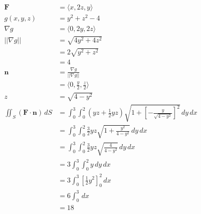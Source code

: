 \documentclass{article}
\begin{document}
\begin{align*}
  \mathbf{F}                                 & = \langle x, 2 z, y \rangle                                                                                              \\
  g(x, y, z)                                 & = y^2 + z^2 - 4                                                                                                          \\
  \nabla g                                   & = \langle 0, 2 y, 2 z \rangle                                                                                            \\
  ||\nabla g||                               & = \sqrt{4 y^2 + 4 z^2}                                                                                                   \\
                                             & = 2 \sqrt{y^2 + z^2}                                                                                                     \\
                                             & = 4                                                                                                                      \\
  \mathbf{n}                                 & = \frac{\nabla g}{||\nabla g||}                                                                                          \\
                                             & = \langle 0, \frac{y}{2}, \frac{z}{2} \rangle                                                                            \\
  z                                          & = \sqrt{4 - y^2}                                                                                                         \\
  \iint_S (\mathbf{F} \cdot \mathbf{n}) \,dS & = \int_0^3 \int_0^2 \left( y z + \frac{1}{2} y z \right) \sqrt{1 + \left[ -\frac{y}{\sqrt{4 - y^2}} \right]^2} \,dy \,dx \\
                                             & = \int_0^3 \int_0^2 \frac{3}{2} y z \sqrt{1 + \frac{y^2}{4 - y^2}} \,dy \,dx                                             \\
                                             & = \int_0^3 \int_0^2 \frac{3}{2} y z \sqrt{\frac{4}{4 - y^2}} \,dy \,dx                                                   \\
                                             & = 3 \int_0^3 \int_0^2 y \,dy \,dx                                                                                        \\
                                             & = 3 \int_0^3 \left[ \frac{1}{2} y^2 \right]_0^2 \,dx                                                                     \\
                                             & = 6 \int_0^3 \,dx                                                                                                        \\
                                             & = 18
\end{align*}
\end{document}
